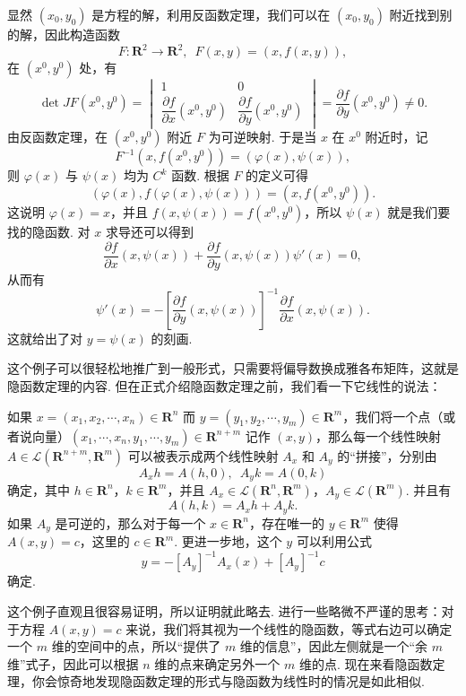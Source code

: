 \begin{solution}
    显然 $(x_0, y_0)$ 是方程的解，利用反函数定理，我们可以在 $(x_0, y_0)$ 附近找到别的解，因此构造函数\[F:\mathbf{R}^2\to \mathbf{R}^2,\enspace F(x, y) = (x, f(x, y)),\]
    在 $(x^0, y^0)$ 处，有 \[\det JF(x^0, y^0) = \begin{vmatrix}
        1 & 0 \\
        \dfrac{\partial f}{\partial x}(x^0, y^0) & \dfrac{\partial f}{\partial y}(x^0, y^0)
    \end{vmatrix} = \dfrac{\partial f}{\partial y}(x^0, y^0)\neq 0.\]
    由反函数定理，在 $(x^0, y^0)$ 附近 $F$ 为可逆映射. 于是当 $x$ 在 $x^0$ 附近时，记 \[F^{-1}(x, f(x^0, y^0)) = (\varphi(x), \psi(x)),\]
    则 $\varphi(x)$ 与 $\psi(x)$ 均为 $C^k$ 函数. 根据 $F$ 的定义可得 \[(\varphi(x), f(\varphi(x), \psi(x))) = (x, f(x^0, y^0)).\]
    这说明 $\varphi(x) = x$，并且 $f(x, \psi(x)) = f(x^0, y^0)$，所以 $\psi(x)$ 就是我们要找的隐函数. 对 $x$ 求导还可以得到 \[\frac{\partial f}{\partial x}(x, \psi(x)) + \frac{\partial f}{\partial y}(x, \psi(x))\psi'(x) = 0,\]
    从而有 \[\psi'(x) = -[\frac{\partial f}{\partial y}(x, \psi(x))]^{-1}\frac{\partial f}{\partial x}(x, \psi(x)).\]
    这就给出了对 $y = \psi(x)$ 的刻画.
\end{solution}

这个例子可以很轻松地推广到一般形式，只需要将偏导数换成雅各布矩阵，这就是隐函数定理的内容. 但在正式介绍隐函数定理之前，我们看一下它线性的说法：

\begin{example}{}{}
    如果 $x = (x_1, x_2, \cdots, x_n)\in\mathbf{R}^n$ 而 $y = (y_1, y_2, \cdots, y_m)\in\mathbf{R}^m$，我们将一个点（或者说向量）$(x_1, \cdots, x_n, y_1, \cdots, y_m)\in \mathbf{R}^{n+m}$ 记作 $(x, y)$，那么每一个线性映射 $A\in \mathcal{L}(\mathbf{R}^{n+m}, \mathbf{R}^{m})$ 可以被表示成两个线性映射 $A_x$ 和 $A_y$ 的“拼接”，分别由 \[A_xh = A(h, 0),\enspace A_yk = A(0, k)\]
    确定，其中 $h\in\mathbf{R}^n$，$k\in\mathbf{R}^m$，并且 $A_x\in \mathcal{L}(\mathbf{R}^n, \mathbf{R}^m)$，$A_y\in \mathcal{L}(\mathbf{R}^m)$. 并且有 \[A(h, k) = A_xh + A_yk.\]
    如果 $A_y$ 是可逆的，那么对于每一个 $x\in\mathbf{R}^n$，存在唯一的 $y\in\mathbf{R}^m$ 使得 $A(x, y) = c$，这里的 $c\in\mathbf{R}^m$. 更进一步地，这个 $y$ 可以利用公式 \[y = -[A_y]^{-1}A_x(x) + [A_y]^{-1}c\] 确定.
\end{example}

这个例子直观且很容易证明，所以证明就此略去. 进行一些略微不严谨的思考：对于方程 $A(x, y) = c$ 来说，我们将其视为一个线性的隐函数，等式右边可以确定一个 $m$ 维的空间中的点，所以“提供了 $m$ 维的信息”，因此左侧就是一个“余 $m$ 维”式子，因此可以根据 $n$ 维的点来确定另外一个 $m$ 维的点. 现在来看隐函数定理，你会惊奇地发现隐函数定理的形式与隐函数为线性时的情况是如此相似.

